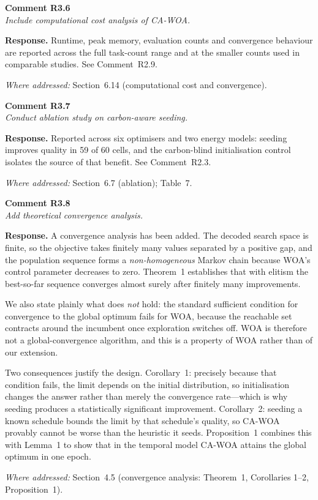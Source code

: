 \documentclass[11pt,a4paper]{article}
\newcommand{\rsp}[1]{\vspace{2pt}\noindent\textbf{Response.} #1\par\vspace{6pt}}
\newcommand{\rwhere}[1]{\noindent\textit{Where addressed:} #1\par\vspace{10pt}}
\newenvironment{revcomment}[1]
  {\begin{tcolorbox}[colback=gray!6,colframe=gray!45,boxrule=0.4pt,
     left=6pt,right=6pt,top=4pt,bottom=4pt]\textbf{#1}\\[2pt]\itshape\color{cmt}}
  {\end{tcolorbox}\vspace{4pt}}
\begin{document}
\begin{revcomment}{Comment R3.6}
Include computational cost analysis of CA-WOA.
\end{revcomment}
\rsp{Runtime, peak memory, evaluation counts and convergence behaviour are reported
across the full task-count range and at the smaller counts used in comparable
studies. See Comment~R2.9.}
\rwhere{Section~6.14 (computational cost and convergence).}

\begin{revcomment}{Comment R3.7}
Conduct ablation study on carbon-aware seeding.
\end{revcomment}
\rsp{Reported across six optimisers and two energy models: seeding improves quality
in 59 of 60 cells, and the carbon-blind initialisation control isolates the source
of that benefit. See Comment~R2.3.}
\rwhere{Section~6.7 (ablation); Table~7.}

\begin{revcomment}{Comment R3.8}
Add theoretical convergence analysis.
\end{revcomment}
\rsp{A convergence analysis has been added. The decoded search space is finite, so
the objective takes finitely many values separated by a positive gap, and the
population sequence forms a \emph{non-homogeneous} Markov chain because WOA's
control parameter decreases to zero. Theorem~1 establishes that with elitism the
best-so-far sequence converges almost surely after finitely many improvements.

We also state plainly what does \emph{not} hold: the standard sufficient condition
for convergence to the global optimum fails for WOA, because the reachable set
contracts around the incumbent once exploration switches off. WOA is therefore not
a global-convergence algorithm, and this is a property of WOA rather than of our
extension.

Two consequences justify the design. Corollary~1: precisely because that condition
fails, the limit depends on the initial distribution, so initialisation changes the
answer rather than merely the convergence rate---which is why seeding produces a
statistically significant improvement. Corollary~2: seeding a known schedule bounds
the limit by that schedule's quality, so CA-WOA provably cannot be worse than the
heuristic it seeds. Proposition~1 combines this with Lemma~1 to show that in the
temporal model CA-WOA attains the global optimum in one epoch.}
\rwhere{Section~4.5 (convergence analysis: Theorem~1, Corollaries 1--2, Proposition~1).}
\end{document}
